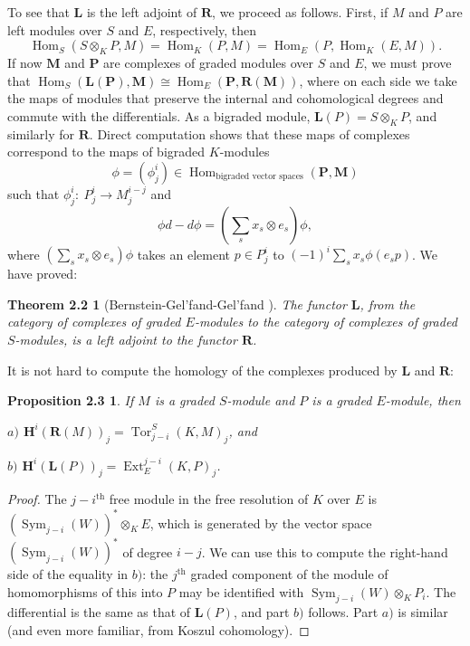 \documentclass{tran-l}
\newcommand{\iso}{\cong}
\newcommand{\myHom}{\operatorname{Hom}}
\newcommand{\Ext}{{\operatorname{Ext}}}
\newcommand{\tor}{{\operatorname{Tor}}}
\newcommand{\Sym}{\operatorname{Sym}}
\newcommand{\myth}{{\operatorname{th}}}
\newcommand{\myH}{\mathbf{H}}
\newcommand{\LL}{\mathbf{L}}
\newcommand{\MM}{\mathbf{M}}
\newcommand{\PP}{\mathbf{P}}
\newcommand{\RR}{\mathbf{R}}
\theoremstyle{plain}
\newtheorem*{theorem4}{Theorem 2.2}
\newtheorem*{theorem5}{Proposition 2.3}
\theoremstyle{remark}
\theoremstyle{definition}
\begin{document}
To see that $\LL $ is the left adjoint of $\RR $, we proceed
as follows. First, if $M$ and $P$ are
left modules over $S$ and $E$, respectively, then
\begin{equation*}\myHom _{S}(S\otimes _{K} P, M)=\myHom _{K}(P,M)=\myHom _{E}(P, \myHom _{K}(E,M)).
\end{equation*}
If now $\MM $ and $\PP $ are complexes of graded modules over $S$ and
$E$, we must prove that $\myHom _{S}(\LL (\PP ),\MM )\iso \myHom _{E}(\PP ,\RR (\MM ))$, where on each side we take the maps of modules
that preserve the internal and cohomological degrees and commute with
the differentials.  As a bigraded module, $\LL (P)=S\otimes _{K}P$, and
similarly for $\RR $.  Direct computation shows that these maps of
complexes correspond to the maps of bigraded $K$-modules
\begin{equation*}\phi =(\phi ^{i}_{j})\in \myHom _{\text{bigraded\ vector \ spaces}}(\PP ,\MM )
\end{equation*}
such that $\phi ^{i}_{j}:\ P^{i}_{j}\to M^{i-j}_{j}$ and
\begin{equation*}\phi d-d\phi =(\sum _{s} x_{s}\otimes e_{s})\phi ,
\end{equation*}
where $(\sum _{s} x_{s}\otimes e_{s})\phi $ takes an element $p\in P^{i}_{j}$
to
$(-1)^{i}\sum _{s} x_{s}\phi (e_{s}p)$.
We have proved:
\begin{theorem4}[Bernstein-Gel'fand-Gel'fand \cite{BGG}]
The functor $\LL $,
from the category of complexes of graded $E$-modules to the category
of complexes of graded $S$-modules, is a left adjoint to the functor
$\RR $.
\end{theorem4}


It is not hard to compute the homology of the complexes
produced by $\LL $ and $\RR $:

\begin{theorem5}
If $M$ is a graded $S$-module and
$P$ is a graded $E$-module, then

{$a)$} $\myH ^{i}(\RR (M))_{j}=\tor ^{S}_{j-i}(K,M)_{j}$, and

{$b)$} $\myH ^{i}(\LL (P))_{j}=\Ext _{E}^{j-i}(K,P)_{j}$.
\end{theorem5}


\begin{proof}  The $j-i^{\myth }$ free module in the free resolution
of $K$ over $E$ is $(\Sym _{j-i}(W))^{*}\otimes _{K} E$, which is generated
by the vector space $(\Sym _{j-i}(W))^{*}$ of degree $i-j$. We can
use this to compute the right-hand side of the equality in $b)$: the
$j^{\myth }$ graded component of the module of homomorphisms of this into $P$
may be identified with $\Sym _{j-i}(W)\otimes _{K} P_{i}$. The differential
is the same as that of $\LL (P)$, and part $b)$ follows. Part $a)$ is
similar (and even more familiar, from Koszul cohomology).
\end{proof}
\end{document}
